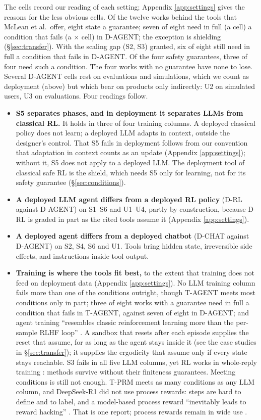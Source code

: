 \documentclass{article}
\providecommand{\tightlist}{\setlength{\itemsep}{0pt}\setlength{\parskip}{0pt}}
\begin{document}
The cells record our reading of each setting; Appendix \ref{app:settings} gives the reasons for the less obvious cells. Of the twelve works behind the tools that McLean et al.~offer, eight state a guarantee; seven of eight need in full (a \checkmark{} cell) a condition that fails (a \(\times\) cell) in D-AGENT; the exception is shielding (§\ref{sec:transfer}). With the scaling gap (S2, S3) granted, six of eight still need in full a condition that fails in D-AGENT. Of the four safety guarantees, three of four need such a condition. The four works with no guarantee have none to lose. Several D-AGENT cells rest on evaluations and simulations, which we count as deployment (above) but which bear on products only indirectly: U2 on simulated users, U3 on evaluations. Four readings follow.

\begin{itemize}
\tightlist
\item
  \textbf{S5 separates phases, and in deployment it separates LLMs from classical RL.} It holds in three of four training columns. A deployed classical policy does not learn; a deployed LLM adapts in context, outside the designer's control. That S5 fails in deployment follows from our convention that adaptation in context counts as an update (Appendix \ref{app:settings}); without it, S5 does not apply to a deployed LLM. The deployment tool of classical safe RL is the shield, which needs S5 only for learning, not for its safety guarantee (§\ref{sec:conditions}).
\item
  \textbf{A deployed LLM agent differs from a deployed RL policy} (D-RL against D-AGENT) on S1--S6 and U1--U4, partly by construction, because D-RL is graded in part as the cited tools assume it (Appendix \ref{app:settings}).
\item
  \textbf{A deployed agent differs from a deployed chatbot} (D-CHAT against D-AGENT) on S2, S4, S6 and U1. Tools bring hidden state, irreversible side effects, and instructions inside tool output.
\item
  \textbf{Training is where the tools fit best,} to the extent that training does not feed on deployment data (Appendix \ref{app:settings}). No LLM training column fails more than one of the conditions outright, though T-AGENT meets most conditions only in part; three of eight works with a guarantee need in full a condition that fails in T-AGENT, against seven of eight in D-AGENT; and agent training ``resembles classic reinforcement learning more than the per-sample RLHF loop'' \citep[§13.3]{lambert2025}. A sandbox that resets after each episode supplies the reset that \citet{wachi2023} assume, for as long as the agent stays inside it (see the case studies in §\ref{sec:transfer}); it supplies the ergodicity that \citet{satija2020} assume only if every state stays reachable. S3 fails in all five LLM columns, yet RL works in whole-reply training \citep{ouyang2022, deepseekai2025}: methods survive without their finiteness guarantees. Meeting conditions is still not enough. T-PRM meets as many conditions as any LLM column, and DeepSeek-R1 did not use process rewards: steps are hard to define and to label, and a model-based process reward ``inevitably leads to reward hacking'' \citep[App. G.2]{deepseekai2025}. That is one report; process rewards remain in wide use \citep{zhang2026}.

\end{itemize}
\end{document}
